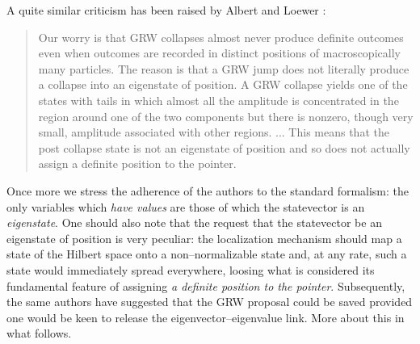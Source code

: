 \documentclass[12pt]{article}
\begin{document}
A quite similar criticism has been raised by Albert and Loewer
\cite{alo1}:
\begin{quotation}
Our worry is that GRW collapses almost never produce definite
outcomes even when outcomes are recorded in distinct positions of
macroscopically many particles. The reason is that a GRW jump does
not literally produce a collapse into an eigenstate of position. A
GRW collapse yields one of the states with tails in which almost
all the amplitude is concentrated in the region around one of the
two components but there is nonzero, though very small, amplitude
associated with other regions. ... This means that the post
collapse state is not an eigenstate of position and so does not
actually assign a definite position to the pointer.
\end{quotation}
Once more we stress the adherence of the authors to the standard
formalism: the only variables which {\it have values} are those of
which the statevector is an {\it eigenstate}. One should also note
that the request that the statevector be an eigenstate of position
is very peculiar: the localization mechanism should map a state of
the Hilbert space onto a non--normalizable state and, at any rate,
such a state would immediately spread everywhere, loosing what is
considered its fundamental feature of assigning {\it a definite
position to the pointer}. Subsequently, the same authors
\cite{alo1} have suggested that the GRW proposal could be saved
provided one would be keen to release the eigenvector--eigenvalue
link. More about this in what follows.
\end{document}
